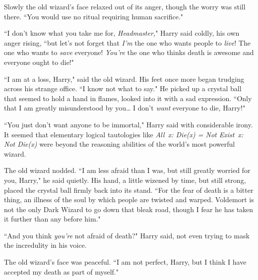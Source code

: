 Slowly the old wizard's face relaxed out of its anger, though the worry was still there. ``You would use no ritual requiring human sacrifice."

``I don't know what you take me for, \emph{Headmaster,}" Harry said coldly, his own anger rising, ``but let's not forget that \emph{I'm} the one who wants people to \emph{live}! The one who wants to \emph{save} everyone! \emph{You're} the one who thinks death is awesome and everyone ought to die!"

``I am at a loss, Harry," said the old wizard. His feet once more began trudging across his strange office. ``I know not what to say." He picked up a crystal ball that seemed to hold a hand in flames, looked into it with a sad expression. ``Only that I am greatly misunderstood by you{\ldots} I don't \emph{want} everyone to die, Harry!"

``You just don't want anyone to be immortal," Harry said with considerable irony. It seemed that elementary logical tautologies like \emph{All~x: Die(x) = Not Exist~x: Not Die(x)} were beyond the reasoning abilities of the world's most powerful wizard.

The old wizard nodded. ``I am less afraid than I was, but still greatly worried for you, Harry," he said quietly. His hand, a little wizened by time, but still strong, placed the crystal ball firmly back into its stand. ``For the fear of death is a bitter thing, an illness of the soul by which people are twisted and warped. Voldemort is not the only Dark Wizard to go down that bleak road, though I fear he has taken it further than any before him."

``And you think \emph{you're} not afraid of death?" Harry said, not even trying to mask the incredulity in his voice.

The old wizard's face was peaceful. ``I am not perfect, Harry, but I think I have accepted my death as part of myself."

